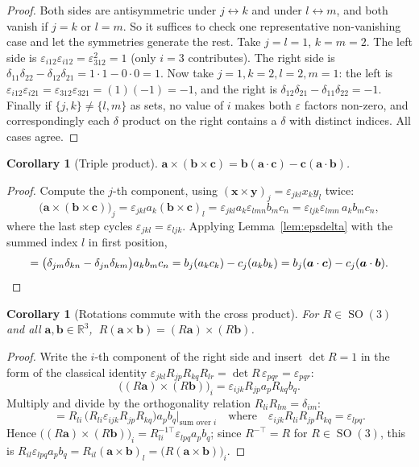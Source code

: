 \documentclass[11pt]{article}
\DeclareMathOperator{\SO}{SO}
\newcommand{\R}{\mathbb{R}}
\newcommand{\vv}[1]{\bm{#1}}
\theoremstyle{plain}
\newtheorem{corollary}[theorem]{Corollary}
\theoremstyle{definition}
\begin{document}
\begin{proof}
Both sides are antisymmetric under $j\leftrightarrow k$ and under $l\leftrightarrow m$, and both
vanish if $j=k$ or $l=m$. So it suffices to check one representative non-vanishing case and let the
symmetries generate the rest. Take $j=l=1$, $k=m=2$. The left side is
$\varepsilon_{i12}\varepsilon_{i12}=\varepsilon_{312}^2=1$ (only $i=3$ contributes). The right side
is $\delta_{11}\delta_{22}-\delta_{12}\delta_{21}=1\cdot1-0\cdot0=1$. Now take $j=1,k=2,l=2,m=1$:
the left is $\varepsilon_{i12}\varepsilon_{i21}=\varepsilon_{312}\varepsilon_{321}=(1)(-1)=-1$, and
the right is $\delta_{12}\delta_{21}-\delta_{11}\delta_{22}=-1$. Finally if $\{j,k\}\ne\{l,m\}$ as
sets, no value of $i$ makes both $\varepsilon$ factors non-zero, and correspondingly each
$\delta$ product on the right contains a $\delta$ with distinct indices. All cases agree.
\end{proof}

\begin{corollary}[Triple product]\label{cor:triple}
$\vv a\times(\vv b\times\vv c)=\vv b(\vv a\cdot\vv c)-\vv c(\vv a\cdot\vv b)$.
\end{corollary}

\begin{proof}
Compute the $j$-th component, using $(\vv x\times\vv y)_j=\varepsilon_{jkl}x_ky_l$ twice:
\[
\big(\vv a\times(\vv b\times\vv c)\big)_j=\varepsilon_{jkl}a_k(\vv b\times\vv c)_l
=\varepsilon_{jkl}a_k\varepsilon_{lmn}b_mc_n=\varepsilon_{ljk}\varepsilon_{lmn}\,a_kb_mc_n ,
\]
where the last step cycles $\varepsilon_{jkl}=\varepsilon_{ljk}$. Applying
Lemma~\ref{lem:epsdelta} with the summed index $l$ in first position,
\[
=\big(\delta_{jm}\delta_{kn}-\delta_{jn}\delta_{km}\big)a_kb_mc_n
=b_j(a_kc_k)-c_j(a_kb_k)=b_j(\vv a\cdot\vv c)-c_j(\vv a\cdot\vv b). \qedhere
\]
\end{proof}

\begin{corollary}[Rotations commute with the cross product]\label{cor:Rcross}
For $R\in\SO(3)$ and all $\vv a,\vv b\in\R^3$, $\ R(\vv a\times\vv b)=(R\vv a)\times(R\vv b)$.
\end{corollary}

\begin{proof}
Write the $i$-th component of the right side and insert $\det R=1$ in the form of the classical
identity $\varepsilon_{jkl}R_{jp}R_{kq}R_{lr}=\det R\,\varepsilon_{pqr}=\varepsilon_{pqr}$:
\[
\big((R\vv a)\times(R\vv b)\big)_i=\varepsilon_{ijk}R_{jp}a_pR_{kq}b_q .
\]
Multiply and divide by the orthogonality relation $R_{li}R_{lm}=\delta_{im}$:
\[
=R_{li}\,\big(R_{li}\varepsilon_{ijk}R_{jp}R_{kq}\big)a_pb_q\Big|_{\text{sum over }i}
\quad\text{where}\quad \varepsilon_{ijk}R_{li}R_{jp}R_{kq}=\varepsilon_{lpq}.
\]
Hence $\big((R\vv a)\times(R\vv b)\big)_i=R_{li}^{-1\top}\varepsilon_{lpq}a_pb_q$; since
$R^{-\top}=R$ for $R\in\SO(3)$, this is $R_{il}\varepsilon_{lpq}a_pb_q
=R_{il}(\vv a\times\vv b)_l=\big(R(\vv a\times\vv b)\big)_i$.
\end{proof}
\end{document}
